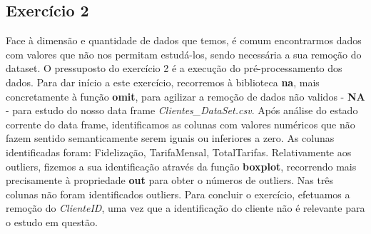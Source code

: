\subsection{Exercício 2}
Face à dimensão e quantidade de dados que temos, é comum encontrarmos dados com valores que não nos permitam estudá-los, sendo necessária a sua remoção do dataset. O pressuposto do exercício 2 é a execução do pré-processamento dos dados. Para dar início a este exercício, recorremos à biblioteca \textbf{na}, mais concretamente à função \textbf{omit}, para agilizar a remoção de dados não validos - \textbf{NA} -  para estudo do nosso data frame \textit{Clientes\_DataSet.csv}. Após análise do estado corrente do data frame, identificamos as colunas com valores numéricos que não fazem sentido semanticamente serem iguais ou inferiores a zero. As colunas identificadas foram: Fidelização, TarifaMensal, TotalTarifas. Relativamente aos outliers, fizemos a sua identificação através da função \textbf{boxplot}, recorrendo mais precisamente à propriedade \textbf{out} para obter o números de outliers. Nas três colunas não foram identificados outliers. Para concluir o exercício, efetuamos a remoção do \textit{ClienteID}, uma vez que a identificação do cliente não é relevante para o estudo em questão.